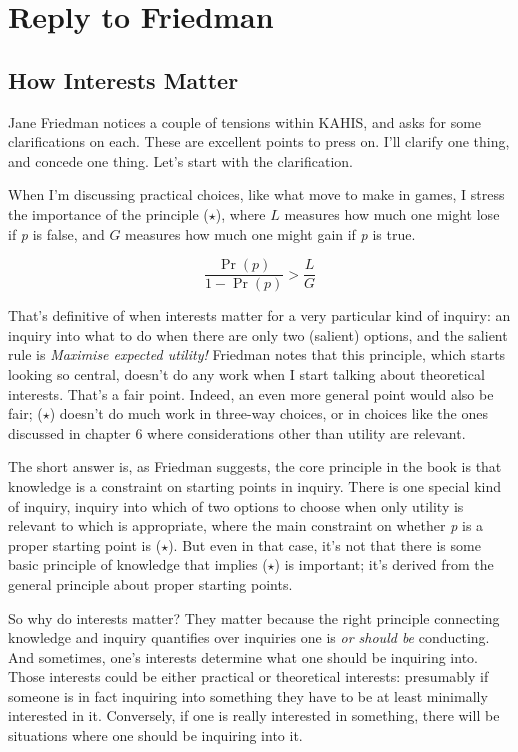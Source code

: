 \documentclass[
  11pt,
  letterpaper,
  DIV=11,
  numbers=noendperiod,
  twoside]{scrartcl}
\begin{document}
\section{Reply to Friedman}\label{sec-friedman}

\subsection{How Interests Matter}\label{sec-friedman-interests}

Jane Friedman notices a couple of tensions within KAHIS, and asks for
some clarifications on each. These are excellent points to press on.
I'll clarify one thing, and concede one thing. Let's start with the
clarification.

When I'm discussing practical choices, like what move to make in games,
I stress the importance of the principle (\(\star\)), where \(L\)
measures how much one might lose if \emph{p} is false, and \(G\)
measures how much one might gain if \emph{p} is true.

\[\frac{\Pr(p)}{1-\Pr(p)} > \frac{L}{G} \tag{$\star$}\]

That's definitive of when interests matter for a very particular kind of
inquiry: an inquiry into what to do when there are only two (salient)
options, and the salient rule is \emph{Maximise expected utility!}
Friedman notes that this principle, which starts looking so central,
doesn't do any work when I start talking about theoretical interests.
That's a fair point. Indeed, an even more general point would also be
fair; (\(\star\)) doesn't do much work in three-way choices, or in
choices like the ones discussed in chapter 6 where considerations other
than utility are relevant.

The short answer is, as Friedman suggests, the core principle in the
book is that knowledge is a constraint on starting points in inquiry.
There is one special kind of inquiry, inquiry into which of two options
to choose when only utility is relevant to which is appropriate, where
the main constraint on whether \emph{p} is a proper starting point is
(\(\star\)). But even in that case, it's not that there is some basic
principle of knowledge that implies (\(\star\)) is important; it's
derived from the general principle about proper starting points.

So why do interests matter? They matter because the right principle
connecting knowledge and inquiry quantifies over inquiries one is
\emph{or should be} conducting. And sometimes, one's interests determine
what one should be inquiring into. Those interests could be either
practical or theoretical interests: presumably if someone is in fact
inquiring into something they have to be at least minimally interested
in it. Conversely, if one is really interested in something, there will
be situations where one should be inquiring into it.
\end{document}
